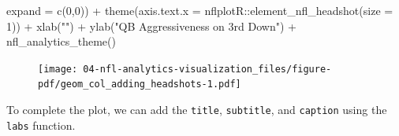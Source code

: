 \documentclass[
  letterpaper,
]{krantz}
\newenvironment{Shaded}{\begin{snugshade}}{\end{snugshade}}
\newcommand{\AttributeTok}[1]{\textcolor[rgb]{0.40,0.45,0.13}{#1}}
\newcommand{\DecValTok}[1]{\textcolor[rgb]{0.68,0.00,0.00}{#1}}
\newcommand{\FunctionTok}[1]{\textcolor[rgb]{0.28,0.35,0.67}{#1}}
\newcommand{\NormalTok}[1]{\textcolor[rgb]{0.00,0.23,0.31}{#1}}
\newcommand{\SpecialCharTok}[1]{\textcolor[rgb]{0.37,0.37,0.37}{#1}}
\newcommand{\StringTok}[1]{\textcolor[rgb]{0.13,0.47,0.30}{#1}}
\begin{document}
\begin{Shaded}
\begin{Highlighting}[]
                     \AttributeTok{expand =} \FunctionTok{c}\NormalTok{(}\DecValTok{0}\NormalTok{,}\DecValTok{0}\NormalTok{)) }\SpecialCharTok{+}
  \FunctionTok{theme}\NormalTok{(}\AttributeTok{axis.text.x =}\NormalTok{ nflplotR}\SpecialCharTok{::}\FunctionTok{element\_nfl\_headshot}\NormalTok{(}\AttributeTok{size =} \DecValTok{1}\NormalTok{)) }\SpecialCharTok{+}
  \FunctionTok{xlab}\NormalTok{(}\StringTok{""}\NormalTok{) }\SpecialCharTok{+}
  \FunctionTok{ylab}\NormalTok{(}\StringTok{"QB Aggressiveness on 3rd Down"}\NormalTok{) }\SpecialCharTok{+}
  \FunctionTok{nfl\_analytics\_theme}\NormalTok{()}
\end{Highlighting}
\end{Shaded}

\begin{figure}[H]

{\centering \texttt{[image: 04-nfl-analytics-visualization\_files/figure-pdf/geom\_col\_adding\_headshots-1.pdf]}

}

\end{figure}

To complete the plot, we can add the \texttt{title}, \texttt{subtitle},
and \texttt{caption} using the \texttt{labs} function.
\end{document}

